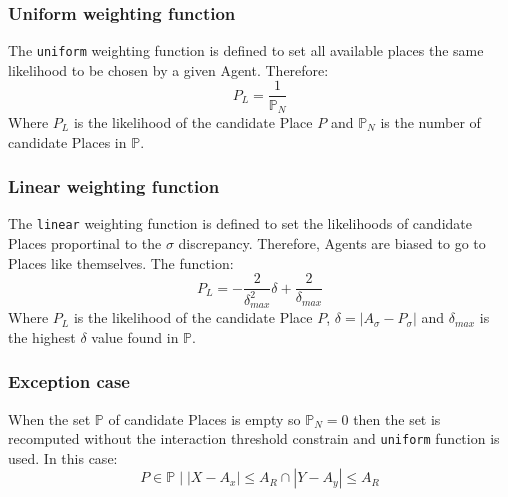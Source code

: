 \documentclass{article}
\begin{document}
\subsubsection{Uniform weighting function}

\par The \texttt{uniform} weighting function is defined to set all available places the same likelihood to be chosen by a given Agent. Therefore:
\begin{equation}
    P_L = \frac{1}{{\mathbb{P}_N}} 
\end{equation}
Where $P_L$ is the likelihood of the candidate Place $P$ and ${\mathbb{P}_N}$ is the number of candidate Places in $\mathbb{P}$.

\subsubsection{Linear weighting function}

\par \par The \texttt{linear} weighting function is defined to set the likelihoods of candidate Places proportinal to the $\sigma$ discrepancy. Therefore, Agents are biased to go to Places like themselves. The function:
\begin{equation}
     P_L = -\frac{2}{\delta_{max}^2} \delta + \frac{2}{\delta_{max}}
\end{equation}
Where $P_L$ is the likelihood of the candidate Place $P$, $\delta = |A_{\sigma} - P_{\sigma}|$ and $\delta_{max}$ is the highest $\delta$ value found in $\mathbb{P}$.

\subsubsection{Exception case}

\par When the set $\mathbb{P}$ of candidate Places is empty so ${\mathbb{P}}_N = 0$ then the set is recomputed without the interaction threshold constrain and \texttt{uniform} function is used. In this case:
\begin{equation}
    P \in \mathbb{P} \;\big|\;|X - A_{x}| \leq A_{R} \cap |Y - A_{y}| \leq A_{R} 
\end{equation}
\end{document}
